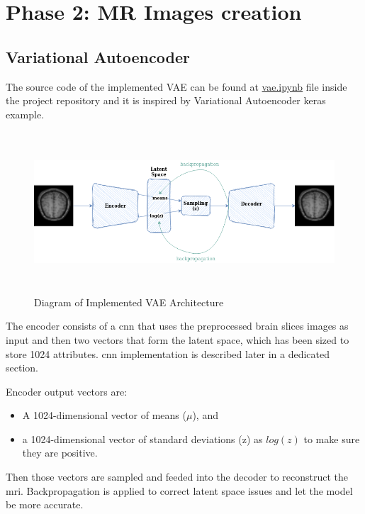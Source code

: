 \section{Phase 2: MR Images creation}

\subsection{Variational Autoencoder}

The source code of the implemented VAE can be found at \href{https://github.com/mtablado/uoc2022_tfm/blob/main/vae.ipynb}{vae.ipynb} file inside the project repository and it is inspired by Variational Autoencoder \cite{vaekeras} keras example.

\begin{figure}[ht]
    \centering
    \includegraphics[width = 16cm, height = 6cm]{images/vae.png}
    \caption[]{Diagram of Implemented VAE Architecture}
    \label{fig:vaearch}
\end{figure}

The encoder consists of a \acrfull*{cnn} that uses the preprocessed brain slices images as input and then two vectors that form the latent space, which has been sized to store 1024 attributes. \acrshort*{cnn} implementation is described later in a dedicated section.

Encoder output vectors are:

\begin{itemize}
    \item A 1024-dimensional vector of means ($\mu$), and
    \item a 1024-dimensional vector of standard deviations (z) as $log(z)$ to make sure they are positive.
\end{itemize}
 
Then those vectors are sampled and feeded into the decoder to reconstruct the \acrshort{mri}. Backpropagation is applied to correct latent space issues and let the model be more accurate.


